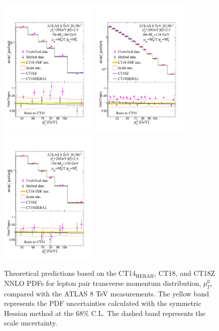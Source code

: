 \begin{figure}[p]
\begin{center}
\includegraphics[width=0.42\textwidth]{./fig/fig2/CT18-7_CT18Z-7_CT14H-7_1_mll1.pdf}
\includegraphics[width=0.42\textwidth]{./fig/fig2/CT18-7_CT18Z-7_CT14H-7_2_mll2.pdf}
\includegraphics[width=0.42\textwidth]{./fig/fig2/CT18-7_CT18Z-7_CT14H-7_3_mll3.pdf}
\caption{Theoretical predictions based on the CT14$_\mathrm{HERAII}$, CT18, and CT18Z NNLO PDFs for lepton pair transverse momentum distribution, $p^{ll}_T$, compared with the ATLAS 8 TeV measurements. The yellow band represents the PDF uncertainties calculated with the symmetric Hessian method at the 68\% C.L. The dashed band represents the scale uncertainty. }
\label{fig:ATL8ZpT}
\end{center}
\end{figure}

